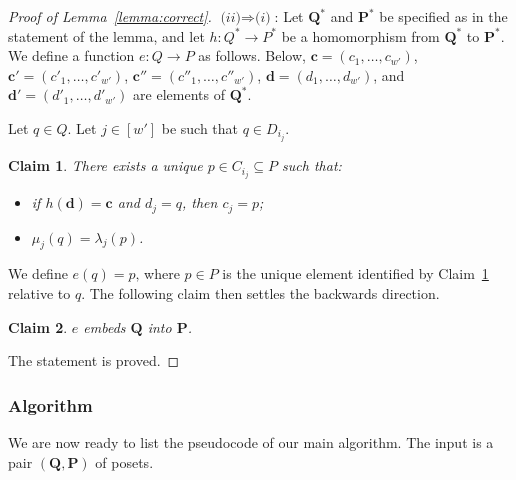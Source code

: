 \documentclass[usletter]{article}
\newcommand{\longversion}[1]{#1}
\newcommand{\shortversion}[1]{}
\newcommand{\longshort}[2]{\longversion{#1}\shortversion{#2}}
\newcommand{\pp}{\mathbf{P}}
\newcommand{\qq}{\mathbf{Q}}
\newtheorem{claim}{Claim}
\begin{document}
\begin{proof}[Proof of Lemma~\ref{lemma:correct}]
$\textit{(ii)} \Rightarrow \textit{(i)}$: Let $\qq^*$ and $\pp^*$ be specified as in the statement of the lemma, 
and let $h \colon Q^* \to P^*$ be a homomorphism from $\qq^*$ to $\pp^*$.  
We define a function $e \colon Q\to P$ as follows.  Below, 
$\mathbf{c}=(c_1,\ldots,c_{w'})$, 
$\mathbf{c}'=(c'_1,\ldots,c'_{w'})$, 
$\mathbf{c}''=(c''_1,\ldots,c''_{w'})$,  
$\mathbf{d}=(d_1,\ldots,d_{w'})$, and $\mathbf{d}'=(d'_1,\ldots,d'_{w'})$ are elements of $\qq^*$.

Let $q \in Q$.  Let $j \in [w']$ be such that $q \in D_{i_j}$.  

\longshort{\begin{claim}}{\begin{claim}}
\label{cl:cl1}
There exists a unique $p \in C_{i_j} \subseteq P$ such that:
\begin{itemize}
\item if $h(\mathbf{d})=\mathbf{c}$ and $d_j=q$, 
then $c_j=p$;
\item $\mu_j(q)=\lambda_j(p)$.
\end{itemize}
\end{claim}

\longshort{\pfcla}{\pfcla}

We define $e(q)=p\text{,}$
where $p \in P$ is the unique element identified by Claim~\ref{cl:cl1} relative to $q$. The following claim then settles the backwards direction.

\longshort{\begin{claim}}{\begin{claim}}
\label{cl:cl2}
$e$ embeds $\qq$ into $\pp$.
\end{claim}
\longshort{\pfclb}{\pfclb}


The statement is proved.\end{proof}



\longshort{\excompilhom}{\excompilhom}



\subsubsection{Algorithm}\label{sect:proof}

We are now ready to 
list the pseudocode of our main algorithm.  
The input is a pair $(\qq,\pp)$ of
posets.  
\end{document}
